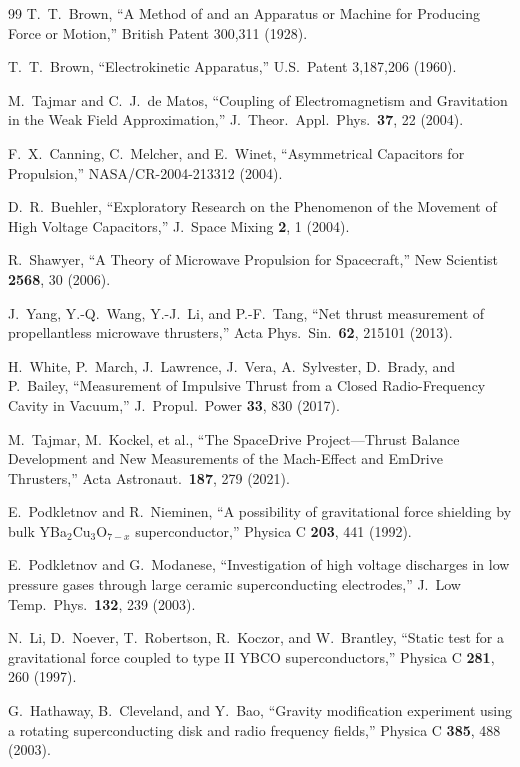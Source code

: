 \documentclass[aps,prd,twocolumn,superscriptaddress,floatfix,nofootinbib]{revtex4-2}
\begin{document}
\begin{thebibliography}{99}
T.~T.~Brown, ``A Method of and an Apparatus or Machine for Producing
Force or Motion,'' British Patent 300,311 (1928).

T.~T.~Brown, ``Electrokinetic Apparatus,'' U.S.\ Patent 3,187,206
(1960).

M.~Tajmar and C.~J.~de Matos, ``Coupling of Electromagnetism and
Gravitation in the Weak Field Approximation,'' J.\ Theor.\ Appl.\
Phys.\ \textbf{37}, 22 (2004).

F.~X.~Canning, C.~Melcher, and E.~Winet, ``Asymmetrical Capacitors
for Propulsion,'' NASA/CR-2004-213312 (2004).

D.~R.~Buehler, ``Exploratory Research on the Phenomenon of the
Movement of High Voltage Capacitors,'' J.\ Space Mixing \textbf{2},
1 (2004).

R.~Shawyer, ``A Theory of Microwave Propulsion for Spacecraft,''
New Scientist \textbf{2568}, 30 (2006).

J.~Yang, Y.-Q.~Wang, Y.-J.~Li, and P.-F.~Tang, ``Net thrust
measurement of propellantless microwave thrusters,'' Acta Phys.\
Sin.\ \textbf{62}, 215101 (2013).

H.~White, P.~March, J.~Lawrence, J.~Vera, A.~Sylvester, D.~Brady,
and P.~Bailey, ``Measurement of Impulsive Thrust from a Closed
Radio-Frequency Cavity in Vacuum,'' J.\ Propul.\ Power \textbf{33},
830 (2017).

M.~Tajmar, M.~Kockel, et al., ``The SpaceDrive Project---Thrust
Balance Development and New Measurements of the Mach-Effect and
EmDrive Thrusters,'' Acta Astronaut.\ \textbf{187}, 279 (2021).

\bibitem{Podkletnov1992}
E.~Podkletnov and R.~Nieminen, ``A possibility of gravitational
force shielding by bulk YBa$_2$Cu$_3$O$_{7-x}$ superconductor,''
Physica C \textbf{203}, 441 (1992).

E.~Podkletnov and G.~Modanese, ``Investigation of high voltage
discharges in low pressure gases through large ceramic superconducting
electrodes,'' J.\ Low Temp.\ Phys.\ \textbf{132}, 239 (2003).

N.~Li, D.~Noever, T.~Robertson, R.~Koczor, and W.~Brantley,
``Static test for a gravitational force coupled to type II YBCO
superconductors,'' Physica C \textbf{281}, 260 (1997).

G.~Hathaway, B.~Cleveland, and Y.~Bao, ``Gravity modification
experiment using a rotating superconducting disk and radio frequency
fields,'' Physica C \textbf{385}, 488 (2003).


\end{thebibliography}
\end{document}
